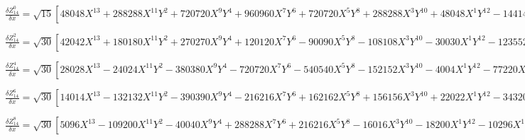 \documentclass[10pt,landscape]{article}
\begin{document}
\vspace{1.2 mm}
\noindent $ \frac{\delta Z^{0}_{14}}{\delta x} = \sqrt{15} [48048X^{13} +288288X^{11}Y^{2} +720720X^{9}Y^{4} +960960X^{7}Y^{6} +720720X^{5}Y^{8} +288288X^{3}Y^{10} +48048X^{1}Y^{12} -144144X^{11} -720720X^{9}Y^{2} -1441440X^{7}Y^{4} -1441440X^{5}Y^{6} -720720X^{3}Y^{8} -144144X^{1}Y^{10} +166320X^{9} +665280X^{7}Y^{2} +997920X^{5}Y^{4} +665280X^{3}Y^{6} +166320X^{1}Y^{8} -92400X^{7} -277200X^{5}Y^{2} -277200X^{3}Y^{4} -92400X^{1}Y^{6} +25200X^{5} +50400X^{3}Y^{2} +25200X^{1}Y^{4} -3024X^{3} -3024X^{1}Y^{2} +112X^{1}] $

\vspace{1.2 mm}
\noindent $ \frac{\delta Z^{2}_{14}}{\delta x} = \sqrt{30} [42042X^{13} +180180X^{11}Y^{2} +270270X^{9}Y^{4} +120120X^{7}Y^{6} -90090X^{5}Y^{8} -108108X^{3}Y^{10} -30030X^{1}Y^{12} -123552X^{11} -411840X^{9}Y^{2} -411840X^{7}Y^{4} +205920X^{3}Y^{8} +82368X^{1}Y^{10} +138600X^{9} +332640X^{7}Y^{2} +166320X^{5}Y^{4} -110880X^{3}Y^{6} -83160X^{1}Y^{8} -73920X^{7} -110880X^{5}Y^{2} +36960X^{1}Y^{6} +18900X^{5} +12600X^{3}Y^{2} -6300X^{1}Y^{4} -2016X^{3} +56X^{1}] $

\vspace{1.2 mm}
\noindent $ \frac{\delta Z^{4}_{14}}{\delta x} = \sqrt{30} [28028X^{13} -24024X^{11}Y^{2} -380380X^{9}Y^{4} -720720X^{7}Y^{6} -540540X^{5}Y^{8} -152152X^{3}Y^{10} -4004X^{1}Y^{12} -77220X^{11} +128700X^{9}Y^{2} +875160X^{7}Y^{4} +1081080X^{5}Y^{6} +437580X^{3}Y^{8} +25740X^{1}Y^{10} +79200X^{9} -190080X^{7}Y^{2} -665280X^{5}Y^{4} -443520X^{3}Y^{6} -47520X^{1}Y^{8} -36960X^{7} +110880X^{5}Y^{2} +184800X^{3}Y^{4} +36960X^{1}Y^{6} +7560X^{5} -25200X^{3}Y^{2} -12600X^{1}Y^{4} -504X^{3} +1512X^{1}Y^{2}] $

\vspace{1.2 mm}
\noindent $ \frac{\delta Z^{6}_{14}}{\delta x} = \sqrt{30} [14014X^{13} -132132X^{11}Y^{2} -390390X^{9}Y^{4} -216216X^{7}Y^{6} +162162X^{5}Y^{8} +156156X^{3}Y^{10} +22022X^{1}Y^{12} -34320X^{11} +343200X^{9}Y^{2} +617760X^{7}Y^{4} -308880X^{3}Y^{8} -68640X^{1}Y^{10} +29700X^{9} -308880X^{7}Y^{2} -249480X^{5}Y^{4} +166320X^{3}Y^{6} +77220X^{1}Y^{8} -10560X^{7} +110880X^{5}Y^{2} -36960X^{1}Y^{6} +1260X^{5} -12600X^{3}Y^{2} +6300X^{1}Y^{4}] $

\vspace{1.2 mm}
\noindent $ \frac{\delta Z^{8}_{14}}{\delta x} = \sqrt{30} [5096X^{13} -109200X^{11}Y^{2} -40040X^{9}Y^{4} +288288X^{7}Y^{6} +216216X^{5}Y^{8} -16016X^{3}Y^{10} -18200X^{1}Y^{12} -10296X^{11} +223080X^{9}Y^{2} -102960X^{7}Y^{4} -432432X^{5}Y^{6} -51480X^{3}Y^{8} +44616X^{1}Y^{10} +6600X^{9} -142560X^{7}Y^{2} +166320X^{5}Y^{4} +110880X^{3}Y^{6} -35640X^{1}Y^{8} -1320X^{7} +27720X^{5}Y^{2} -46200X^{3}Y^{4} +9240X^{1}Y^{6}] $
\end{document}
